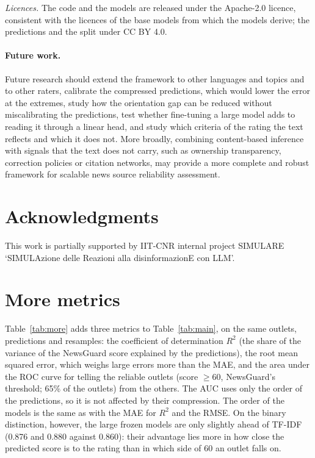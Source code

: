 \documentclass[11pt,a4paper]{article}
\begin{document}
\emph{Licences.} The code and the models are released under the Apache-2.0 licence, consistent with the licences of
the base models from which the models derive; the predictions and the split under CC BY 4.0.

\paragraph{Future work.}
Future research should extend the framework to other languages and topics and to other raters, calibrate the compressed predictions, which would lower the error at the extremes, study how the orientation gap can
be reduced without miscalibrating the predictions, test
whether fine-tuning a large model adds to reading it through a linear head, and study which criteria of the rating the
text reflects and which it does not. More broadly, combining content-based inference with signals that the text does not carry, such as
ownership transparency, correction policies or citation networks, may provide a more complete and robust framework
for scalable news source reliability assessment.

\section*{Acknowledgments}
This work is partially supported by IIT-CNR internal project SIMULARE `SIMULAzione delle Reazioni alla
disinformazionE con LLM'.




\appendix

\section{More metrics}\label{app:measures}
Table~\ref{tab:more} adds three metrics to Table~\ref{tab:main}, on the same outlets, predictions and resamples: the
coefficient of determination $R^2$ (the share of the variance of the NewsGuard score explained by the predictions), the
root mean squared error, which weighs large errors more than the MAE, and the area under the ROC curve for telling the
reliable outlets (score $\geq 60$, NewsGuard's threshold; 65\% of the outlets) from the others. The AUC uses only the
order of the predictions, so it is not affected by their compression. The order of the models is the same as with the MAE for $R^2$ and the RMSE. On the binary distinction, however, the large frozen models are only slightly ahead of TF-IDF (0.876 and 0.880
against 0.860): their advantage lies more in how close the predicted score is to the rating than in which side of 60 an
outlet falls on.
\end{document}
